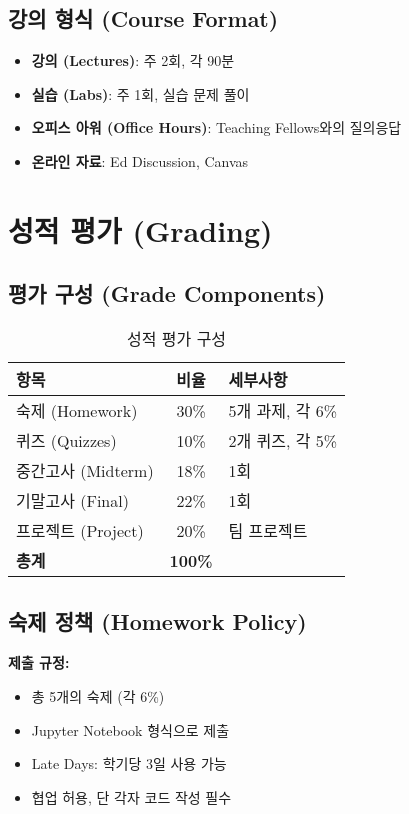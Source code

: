 \documentclass[12pt,a4paper]{article}
\begin{document}
\subsection{강의 형식 (Course Format)}

\begin{itemize}
    \item \textbf{강의 (Lectures)}: 주 2회, 각 90분
    \item \textbf{실습 (Labs)}: 주 1회, 실습 문제 풀이
    \item \textbf{오피스 아워 (Office Hours)}: Teaching Fellows와의 질의응답
    \item \textbf{온라인 자료}: Ed Discussion, Canvas
\end{itemize}

\section{성적 평가 (Grading)}

\subsection{평가 구성 (Grade Components)}

\begin{table}[h]
\centering
\begin{tabular}{|l|c|l|}
\hline
\textbf{항목} & \textbf{비율} & \textbf{세부사항} \\
\hline
숙제 (Homework) & 30\% & 5개 과제, 각 6\% \\
\hline
퀴즈 (Quizzes) & 10\% & 2개 퀴즈, 각 5\% \\
\hline
중간고사 (Midterm) & 18\% & 1회 \\
\hline
기말고사 (Final) & 22\% & 1회 \\
\hline
프로젝트 (Project) & 20\% & 팀 프로젝트 \\
\hline
\textbf{총계} & \textbf{100\%} & \\
\hline
\end{tabular}
\caption{성적 평가 구성}
\end{table}

\subsection{숙제 정책 (Homework Policy)}

\textbf{제출 규정:}
\begin{itemize}
    \item 총 5개의 숙제 (각 6\%)
    \item Jupyter Notebook 형식으로 제출
    \item Late Days: 학기당 3일 사용 가능
    \item 협업 허용, 단 각자 코드 작성 필수
\end{itemize}
\end{document}
